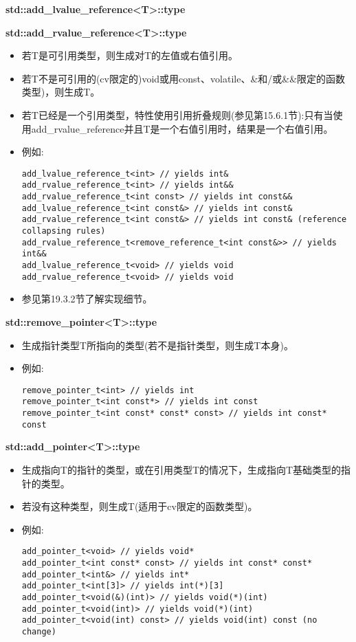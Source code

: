 \textbf{std::add\_lvalue\_reference<T>::type}

\textbf{std::add\_rvalue\_reference<T>::type}

\begin{itemize}
\item
若T是可引用类型，则生成对T的左值或右值引用。

\item
若T不是可引用的(cv限定的)void或用const、volatile、\&和/或\&\&限定的函数类型)，则生成T。

\item
若T已经是一个引用类型，特性使用引用折叠规则(参见第15.6.1节):只有当使用add\_rvalue\_reference并且T是一个右值引用时，结果是一个右值引用。

\item
例如:
\begin{lstlisting}[style=styleCXX]
add_lvalue_reference_t<int> // yields int&
add_rvalue_reference_t<int> // yields int&&
add_rvalue_reference_t<int const> // yields int const&&
add_lvalue_reference_t<int const&> // yields int const&
add_rvalue_reference_t<int const&> // yields int const& (reference collapsing rules)
add_rvalue_reference_t<remove_reference_t<int const&>> // yields int&&
add_lvalue_reference_t<void> // yields void
add_rvalue_reference_t<void> // yields void
\end{lstlisting}

\item
参见第19.3.2节了解实现细节。
\end{itemize}

\textbf{std::remove\_pointer<T>::type}

\begin{itemize}
\item
生成指针类型T所指向的类型(若不是指针类型，则生成T本身)。

\item
例如:
\begin{lstlisting}[style=styleCXX]
remove_pointer_t<int> // yields int
remove_pointer_t<int const*> // yields int const
remove_pointer_t<int const* const* const> // yields int const* const
\end{lstlisting}
\end{itemize}

\textbf{std::add\_pointer<T>::type}

\begin{itemize}
\item
生成指向T的指针的类型，或在引用类型T的情况下，生成指向T基础类型的指针的类型。

\item
若没有这种类型，则生成T(适用于cv限定的函数类型)。

\item
例如:
\begin{lstlisting}[style=styleCXX]
add_pointer_t<void> // yields void*
add_pointer_t<int const* const> // yields int const* const*
add_pointer_t<int&> // yields int*
add_pointer_t<int[3]> // yields int(*)[3]
add_pointer_t<void(&)(int)> // yields void(*)(int)
add_pointer_t<void(int)> // yields void(*)(int)
add_pointer_t<void(int) const> // yields void(int) const (no change)
\end{lstlisting}
\end{itemize}


